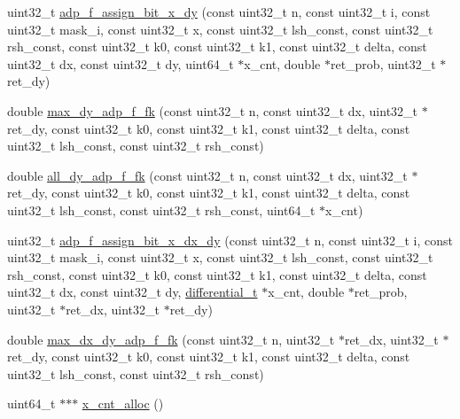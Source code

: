 \begin{DoxyCompactItemize}
\item 
uint32\-\_\-t \hyperlink{adp-tea-f-fk_8cc_aae562be508050d9e6ecdae77897a1133}{adp\-\_\-f\-\_\-assign\-\_\-bit\-\_\-x\-\_\-dy} (const uint32\-\_\-t n, const uint32\-\_\-t i, const uint32\-\_\-t mask\-\_\-i, const uint32\-\_\-t x, const uint32\-\_\-t lsh\-\_\-const, const uint32\-\_\-t rsh\-\_\-const, const uint32\-\_\-t k0, const uint32\-\_\-t k1, const uint32\-\_\-t delta, const uint32\-\_\-t dx, const uint32\-\_\-t dy, uint64\-\_\-t $\ast$x\-\_\-cnt, double $\ast$ret\-\_\-prob, uint32\-\_\-t $\ast$ret\-\_\-dy)
\item 
double \hyperlink{adp-tea-f-fk_8cc_a2f54b400bfcf7269993eb54751c072fb}{max\-\_\-dy\-\_\-adp\-\_\-f\-\_\-fk} (const uint32\-\_\-t n, const uint32\-\_\-t dx, uint32\-\_\-t $\ast$ret\-\_\-dy, const uint32\-\_\-t k0, const uint32\-\_\-t k1, const uint32\-\_\-t delta, const uint32\-\_\-t lsh\-\_\-const, const uint32\-\_\-t rsh\-\_\-const)
\item 
double \hyperlink{adp-tea-f-fk_8cc_addb1c3108db9d2478da5e46e645ba86b}{all\-\_\-dy\-\_\-adp\-\_\-f\-\_\-fk} (const uint32\-\_\-t n, const uint32\-\_\-t dx, uint32\-\_\-t $\ast$ret\-\_\-dy, const uint32\-\_\-t k0, const uint32\-\_\-t k1, const uint32\-\_\-t delta, const uint32\-\_\-t lsh\-\_\-const, const uint32\-\_\-t rsh\-\_\-const, uint64\-\_\-t $\ast$x\-\_\-cnt)
\item 
uint32\-\_\-t \hyperlink{adp-tea-f-fk_8cc_a1fbc1386595fdbbdee8d7b8f19a17d5e}{adp\-\_\-f\-\_\-assign\-\_\-bit\-\_\-x\-\_\-dx\-\_\-dy} (const uint32\-\_\-t n, const uint32\-\_\-t i, const uint32\-\_\-t mask\-\_\-i, const uint32\-\_\-t x, const uint32\-\_\-t lsh\-\_\-const, const uint32\-\_\-t rsh\-\_\-const, const uint32\-\_\-t k0, const uint32\-\_\-t k1, const uint32\-\_\-t delta, const uint32\-\_\-t dx, const uint32\-\_\-t dy, \hyperlink{structdifferential__t}{differential\-\_\-t} $\ast$x\-\_\-cnt, double $\ast$ret\-\_\-prob, uint32\-\_\-t $\ast$ret\-\_\-dx, uint32\-\_\-t $\ast$ret\-\_\-dy)
\item 
double \hyperlink{adp-tea-f-fk_8cc_a2df7ed20567ef6e3c054e2acd67bf267}{max\-\_\-dx\-\_\-dy\-\_\-adp\-\_\-f\-\_\-fk} (const uint32\-\_\-t n, uint32\-\_\-t $\ast$ret\-\_\-dx, uint32\-\_\-t $\ast$ret\-\_\-dy, const uint32\-\_\-t k0, const uint32\-\_\-t k1, const uint32\-\_\-t delta, const uint32\-\_\-t lsh\-\_\-const, const uint32\-\_\-t rsh\-\_\-const)
\item 
uint64\-\_\-t $\ast$$\ast$$\ast$ \hyperlink{adp-tea-f-fk_8cc_ab4e509bba222c76d59129ff86d32a045}{x\-\_\-cnt\-\_\-alloc} ()
\item 

\end{DoxyCompactItemize}
